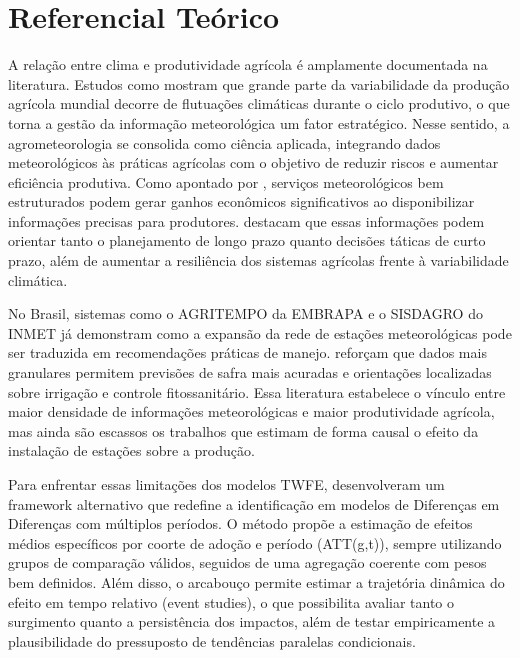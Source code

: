 \documentclass[
	12pt,				%
	openright,			%
	oneside,			%
	a4paper,			%
	english,			%
	french,				%
	spanish,			%
	brazil				%
	]{abntex2}
\begin{document}
\chapter{Referencial Teórico}

A relação entre clima e produtividade agrícola é amplamente documentada na literatura. Estudos como  mostram que grande parte da variabilidade da produção agrícola mundial decorre de flutuações climáticas durante o ciclo produtivo, o que torna a gestão da informação meteorológica um fator estratégico. Nesse sentido, a agrometeorologia se consolida como ciência aplicada, integrando dados meteorológicos às práticas agrícolas com o objetivo de reduzir riscos e aumentar eficiência produtiva. Como apontado por , serviços meteorológicos bem estruturados podem gerar ganhos econômicos significativos ao disponibilizar informações precisas para produtores.  destacam que essas informações podem orientar tanto o planejamento de longo prazo quanto decisões táticas de curto prazo, além de aumentar a resiliência dos sistemas agrícolas frente à variabilidade climática.

No Brasil, sistemas como o AGRITEMPO da EMBRAPA e o SISDAGRO do INMET já demonstram como a expansão da rede de estações meteorológicas pode ser traduzida em recomendações práticas de manejo.  reforçam que dados mais granulares permitem previsões de safra mais acuradas e orientações localizadas sobre irrigação e controle fitossanitário. Essa literatura estabelece o vínculo entre maior densidade de informações meteorológicas e maior produtividade agrícola, mas ainda são escassos os trabalhos que estimam de forma causal o efeito da instalação de estações sobre a produção.

Para enfrentar essas limitações dos modelos TWFE,  desenvolveram um framework alternativo que redefine a identificação em modelos de Diferenças em Diferenças com múltiplos períodos. O método propõe a estimação de efeitos médios específicos por coorte de adoção e período (ATT(g,t)), sempre utilizando grupos de comparação válidos, seguidos de uma agregação coerente com pesos bem definidos. Além disso, o arcabouço permite estimar a trajetória dinâmica do efeito em tempo relativo (event studies), o que possibilita avaliar tanto o surgimento quanto a persistência dos impactos, além de testar empiricamente a plausibilidade do pressuposto de tendências paralelas condicionais.
\end{document}
